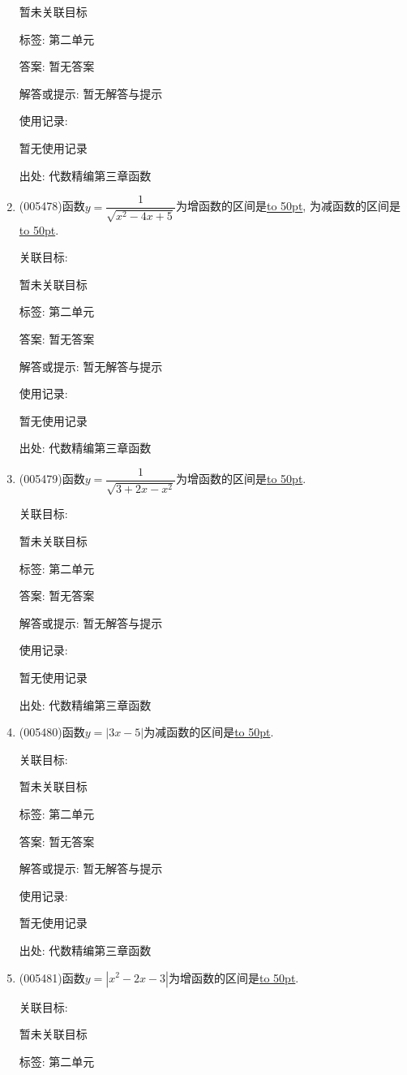 \documentclass[10pt,a4paper]{article}
\newcommand{\blank}[1]{\underline{\hbox to #1pt{}}}
\begin{document}
\begin{enumerate}[1.]
暂未关联目标



标签: 第二单元

答案: 暂无答案

解答或提示: 暂无解答与提示

使用记录:

暂无使用记录


出处: 代数精编第三章函数
\item { (005478)}函数$y=\dfrac 1{\sqrt {x^2-4x+5}}$为增函数的区间是\blank{50}, 为减函数的区间是\blank{50}.


关联目标:

暂未关联目标



标签: 第二单元

答案: 暂无答案

解答或提示: 暂无解答与提示

使用记录:

暂无使用记录


出处: 代数精编第三章函数
\item { (005479)}函数$y=\dfrac 1{\sqrt {3+2x-x^2}}$为增函数的区间是\blank{50}.


关联目标:

暂未关联目标



标签: 第二单元

答案: 暂无答案

解答或提示: 暂无解答与提示

使用记录:

暂无使用记录


出处: 代数精编第三章函数
\item { (005480)}函数$y=|3x-5|$为减函数的区间是\blank{50}.


关联目标:

暂未关联目标



标签: 第二单元

答案: 暂无答案

解答或提示: 暂无解答与提示

使用记录:

暂无使用记录


出处: 代数精编第三章函数
\item { (005481)}函数$y=|x^2-2x-3|$为增函数的区间是\blank{50}.


关联目标:

暂未关联目标



标签: 第二单元


\end{enumerate}
\end{document}
